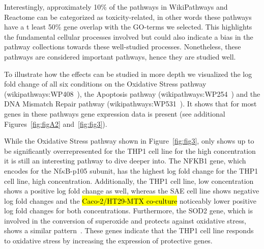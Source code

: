 \documentclass[ijms,article,submit,moreauthors,pdftex]{Definitions/mdpi}
\begin{document}
Interestingly, approximately 10\% of the pathways in WikiPathways and Reactome can be categorized as toxicity-related, in other words these pathways have a t least 50\% gene overlap with the GO-terms we selected. This highlights the fundamental cellular processes involved but could also indicate a bias in the pathway collections towards these well-studied processes. Nonetheless, these pathways are considered important pathways, hence they are studied well.  

To illustrate how the effects can be studied in more depth we visualized the log fold change of all six conditions on the Oxidative Stress pathway (wikipathways:WP408~\cite{WP408}), the Apoptosis pathway (wikipathways:WP254~\cite{WP254}) and the DNA Mismatch Repair pathway (wikipathways:WP531~\cite{WP531}). It shows that for most genes in these pathways gene expression data is present (see additional Figures~\ref{fig:figA2} and~\ref{fig:fig3}). 

While the Oxidative Stress pathway shown in Figure~\ref{fig:fig3}, only shows up to be significantly overrepresented for the THP1 cell line for the high concentration it is still an interesting pathway to dive deeper into. The NFKB1 gene, which encodes for the Nf$\kappa$B-p105 subunit, has the highest log fold change for the THP1 cell line, high concentration. Additionally, the THP1 cell line, low concentration shows a positive log fold change as well, whereas the SAE cell line shows negative log fold changes and the \hl{Caco-2/HT29-MTX co-culture} noticeably lower positive log fold changes for both concentrations. Furthermore, the SOD2 gene, which is involved in the conversion of superoxide and protects against oxidative stress, shows a similar pattern~\cite{Urso2003}. These genes indicate that the THP1 cell line responds to oxidative stress by increasing the expression of protective genes. 
\end{document}
